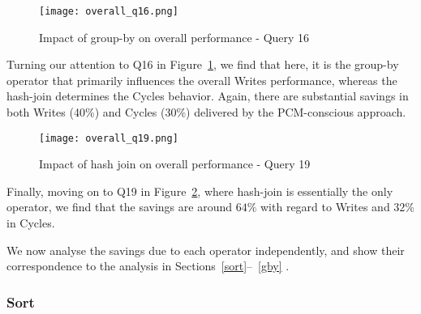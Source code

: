 \begin{figure}[htbp]
	\centering
	\texttt{[image: overall\_q16.png]}
	\caption{Impact of group-by on overall performance - Query 16}
	\label{fig:overall_results_q16}
\end{figure}
Turning our attention to Q16 in Figure~\ref{fig:overall_results_q16},
we find that here, it is the group-by operator that primarily influences
the overall Writes performance, whereas the hash-join determines the
Cycles behavior. Again, there are substantial savings in both Writes
(40\%) and  Cycles (30\%) delivered by the PCM-conscious approach.

\begin{figure}[htbp]
	\centering
 	\texttt{[image: overall\_q19.png]}
	\caption{Impact of hash join on overall performance - Query 19}
	\label{fig:overall_results_q19}
\end{figure}



\begin{comment}
In case of Q13, the running time and writes for the sort operator formed
the bulk of the writes and time taken for the entire query. The group-by
operator comparatively incurred negligible writes and running time. Writes
savings of 84\% and running time savings of 42\% were observed for the
execution of Q13 (shown in sub-figures (a) and (b) resp.) as compared
to native; fuelled mainly by the sort operator.
\end{comment}



\begin{comment}
In case of Q16, both the group-by and hash join operators incurred
significant writes and time. We observed savings of $40\%$ in writes
besides $30\%$ savings in running time as compared to  native algorithms.
\end{comment}

Finally, moving on to Q19 in Figure~\ref{fig:overall_results_q19},
where hash-join is essentially the only operator, we find that the
savings are around $64\%$ with regard to Writes and $32\%$ in Cycles.

We now analyse the savings due to each operator independently, and
show their correspondence to the analysis in Sections~\ref{sort}--~\ref{gby} . 
 
\subsubsection{Sort}

